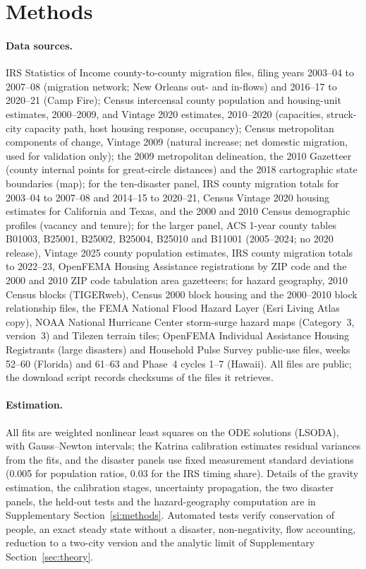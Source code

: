 \documentclass[11pt]{article}
\begin{document}
\section*{Methods}
\paragraph{Data sources.} IRS Statistics of Income county-to-county migration files, filing years 2003--04 to 2007--08 (migration network; New Orleans out- and in-flows) and 2016--17 to 2020--21 (Camp Fire); Census intercensal county population and housing-unit estimates, 2000--2009, and Vintage 2020 estimates, 2010--2020 (capacities, struck-city capacity path, host housing response, occupancy); Census metropolitan components of change, Vintage 2009 (natural increase; net domestic migration, used for validation only); the 2009 metropolitan delineation, the 2010 Gazetteer (county internal points for great-circle distances) and the 2018 cartographic state boundaries (map); for the ten-disaster panel, IRS county migration totals for 2003--04 to 2007--08 and 2014--15 to 2020--21, Census Vintage 2020 housing estimates for California and Texas, and the 2000 and 2010 Census demographic profiles (vacancy and tenure); for the larger panel, ACS 1-year county tables B01003, B25001, B25002, B25004, B25010 and B11001 (2005--2024; no 2020 release), Vintage 2025 county population estimates, IRS county migration totals to 2022--23, OpenFEMA Housing Assistance registrations by ZIP code and the 2000 and 2010 ZIP code tabulation area gazetteers; for hazard geography, 2010 Census blocks (TIGERweb), Census 2000 block housing and the 2000--2010 block relationship files, the FEMA National Flood Hazard Layer (Esri Living Atlas copy), NOAA National Hurricane Center storm-surge hazard maps (Category~3, version~3) and Tilezen terrain tiles; OpenFEMA Individual Assistance Housing Registrants (large disasters) and Household Pulse Survey public-use files, weeks 52--60 (Florida) and 61--63 and Phase~4 cycles 1--7 (Hawaii). All files are public; the download script records checksums of the files it retrieves.

\paragraph{Estimation.} All fits are weighted nonlinear least squares on the ODE solutions (LSODA), with Gauss--Newton intervals; the Katrina calibration estimates residual variances from the fits, and the disaster panels use fixed measurement standard deviations (0.005 for population ratios, 0.03 for the IRS timing share). Details of the gravity estimation, the calibration stages, uncertainty propagation, the two disaster panels, the held-out tests and the hazard-geography computation are in Supplementary Section~\ref{si:methods}. Automated tests verify conservation of people, an exact steady state without a disaster, non-negativity, flow accounting, reduction to a two-city version and the analytic limit of Supplementary Section~\ref{sec:theory}.
\end{document}
